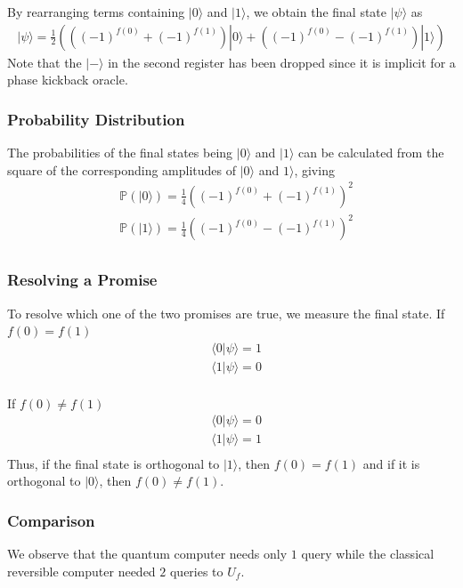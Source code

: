 \documentclass{article}
\begin{document}
By rearranging terms containing $|0\rangle$ and $|1\rangle$, we obtain the final state $|\psi\rangle$ as
\begin{align*}
	|\psi\rangle=\frac{1}{2} \left( ((-1)^{f(0)} + (-1)^{f(1)})|0\rangle + ((-1)^{f(0)} - (-1)^{f(1)})|1\rangle \right)
\end{align*}
Note that the $|-\rangle$ in the second register has been dropped since it is implicit for a phase kickback oracle.

\subsubsection{Probability Distribution}
The probabilities of the final states being $|0\rangle$ and $|1\rangle$ can be calculated from the square of the corresponding amplitudes of $|0\rangle$ and $1\rangle$, giving
\begin{align*}
	 & \mathds{P}(|0\rangle) = \frac{1}{4} \left( (-1)^{f(0)} + (-1)^{f(1)} \right) ^2 \\
	 & \mathds{P}(|1\rangle) = \frac{1}{4} \left( (-1)^{f(0)} - (-1)^{f(1)} \right) ^2 \\
\end{align*}

\subsubsection{Resolving a Promise}
To resolve which one of the two promises are true, we measure the final state.
If $f(0)=f(1)$
\begin{align*}
	 & \langle 0 | \psi \rangle = 1 \\
	 & \langle 1| \psi \rangle = 0  \\
\end{align*}

If $f(0)\neq f(1)$
\begin{align*}
	 & \langle 0 | \psi \rangle = 0 \\
	 & \langle 1| \psi \rangle = 1  \\
\end{align*}
Thus, if the final state is orthogonal to $|1\rangle$, then $f(0)=f(1)$ and if it is orthogonal to $|0\rangle$, then $f(0) \neq f(1)$. \\

\subsubsection{Comparison}
We observe that the quantum computer needs only $1$ query while the classical reversible computer needed $2$ queries to $U_f$.
\end{document}
